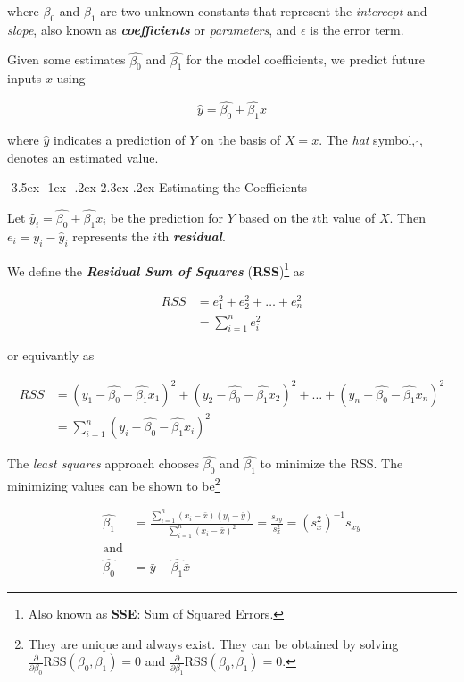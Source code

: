 \documentclass[]{book}
\makeatletter
\let\rmarkdownfootnote\footnote%
\def\footnote{\protect\rmarkdownfootnote}
\renewcommand\section{\@startsection {section}{1}{\z@}%
                                   {-3.5ex \@plus -1ex \@minus -.2ex}%
                                   {2.3ex \@plus.2ex}%
                                   {\normalfont\Large\bfseries\color{ForestGreen}}}
\theoremstyle{definition}
\theoremstyle{definition}
\theoremstyle{definition}
\theoremstyle{remark}
\makeatother
\begin{document}
where \(\beta_0\) and \(\beta_1\) are two unknown constants that
represent the \emph{intercept} and \emph{slope}, also known as
\textbf{\emph{coefficients}} or \emph{parameters}, and \(\epsilon\) is
the error term.

Given some estimates \(\hat{\beta_0}\) and \(\hat{\beta_1}\) for the
model coefficients, we predict future inputs \(x\) using

\[\hat{y} = \hat{\beta_0} + \hat{\beta_1} x\]

where \(\hat{y}\) indicates a prediction of \(Y\) on the basis of
\(X = x\). The \emph{hat} symbol, \(\hat{}\), denotes an estimated
value.

\section{Estimating the Coefficients}\label{estimating-the-coefficients}

Let \(\hat{y}_i = \hat{\beta_0} + \hat{\beta_1} x_i\) be the prediction
for \(Y\) based on the \(i\)th value of \(X\). Then
\(e_i = y_i - \hat{y}_i\) represents the \(i\)th
\textbf{\emph{residual}}.

We define the \textbf{\emph{Residual Sum of Squares}}
(\textbf{RSS})\footnote{Also known as \textbf{SSE}: Sum of Squared
  Errors.} as

\[  \begin{aligned}
RSS &= e_1^2 + e_2^2 + \ldots + e_n^2 \\
    &= \sum_{i=1}^{n} e_i^2
 \end{aligned}  \]

or equivantly as

\[ \begin{aligned}
RSS &= (y_1 - \hat{\beta_0} - \hat{\beta_1} x_1)^2 + (y_2 - \hat{\beta_0} - \hat{\beta_1} x_2)^2 + \ldots + (y_n - \hat{\beta_0} - \hat{\beta_1} x_n)^2 \\
    &= \sum_{i=1}^{n} (y_i - \hat{\beta_0} - \hat{\beta_1} x_i)^2
\end{aligned} \]

The \emph{least squares} approach chooses \(\hat{\beta_0}\) and
\(\hat{\beta_1}\) to minimize the RSS. The minimizing values can be
shown to be\footnote{They are unique and always exist. They can be
  obtained by solving
  \(\frac{\partial}{\partial \beta_0}\text{RSS}(\beta_0,\beta_1)=0\) and
  \(\frac{\partial}{\partial \beta_1}\text{RSS}(\beta_0,\beta_1)=0\).}

\[  \begin{aligned}
\hat{\beta_1} &=  \frac{\sum_{i=1}^{n} (x_i - \bar{x})(y_i - \bar{y})  }{\sum_{i=1}^{n} (x_i - \bar{x})^2 } = \frac{s_{xy}}{s_x^2} = (s_x^2)^{-1} s_{xy} \\
\text{and} \\
\hat{\beta_0} &= \bar{y} - \hat{\beta_1} \bar{x}
\end{aligned}  \]
\end{document}
